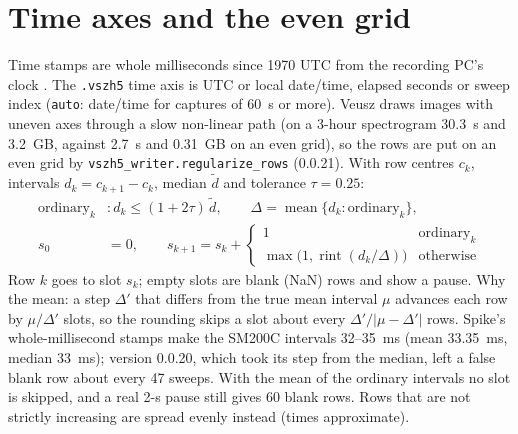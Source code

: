 \documentclass[11pt,a4paper]{article}
\newcommand{\code}[1]{\texttt{#1}}
\begin{document}
\section{Time axes and the even grid}\label{sec:grid}
Time stamps are whole milliseconds since 1970 UTC from the recording PC's clock \cite{r2}. The \code{.vszh5}
time axis is UTC or local date/time, elapsed seconds or sweep index (\code{auto}: date/time for captures of
60~s or more). Veusz draws images with uneven axes through a slow non-linear path (on a 3-hour spectrogram
30.3~s and 3.2~GB, against 2.7~s and 0.31~GB on an even grid), so the rows are put on an even grid by
\code{vszh5\_writer.regularize\_rows} (0.0.21). With row centres $c_k$, intervals
$d_k=c_{k+1}-c_k$, median $\tilde d$ and tolerance $\tau=0.25$:
\begin{align}
\text{ordinary}_k &: d_k\le(1+2\tau)\,\tilde d,\qquad
\Delta=\operatorname{mean}\{d_k:\text{ordinary}_k\},\\
s_0&=0,\qquad s_{k+1}=s_k+\begin{cases}1 & \text{ordinary}_k\\ \max\!\big(1,\operatorname{rint}(d_k/\Delta)\big) & \text{otherwise}\end{cases}
\end{align}
Row $k$ goes to slot $s_k$; empty slots are blank (NaN) rows and show a pause. Why the mean: a step $\Delta'$
that differs from the true mean interval $\mu$ advances each row by $\mu/\Delta'$ slots, so the rounding skips a
slot about every $\Delta'/|\mu-\Delta'|$ rows. Spike's whole-millisecond stamps make the SM200C intervals
32--35~ms (mean 33.35~ms, median 33~ms); version 0.0.20, which took its step from the median, left a false blank
row about every 47 sweeps. With the mean of the ordinary intervals no slot is skipped, and a real 2-s pause
still gives 60 blank rows. Rows that are not strictly increasing are spread evenly instead (times approximate).
\end{document}
